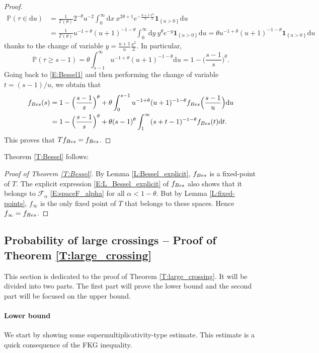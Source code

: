 \documentclass[11pt]{article}
\theoremstyle{remark}
\newcommand{\Fc}{\mathcal{F}}
\newcommand{\Prob}[1]{\mathbb{P} \left( #1 \right) }
\newcommand{\indic}[1]{ \mathbf{1}_{ \left\{ #1 \right\} } }
\renewcommand{\d}{\mathrm{d}}
\numberwithin{equation}{section}
\begin{document}
\begin{proof}
\begin{align*}
\Prob{ \tau \in \d u }
& = \frac{1}{\Gamma(\theta)} 2^{-\theta} u^{-2} \int_0^\infty \d x ~x^{2\theta + 1} e^{- \frac{u+1}{u}\frac{x^2}{2}} \indic{u >0} \d u \\
& = \frac{1}{\Gamma(\theta)} u^{-1+\theta} (u+1)^{-1-\theta} \int_0^\infty \d y ~ y^\theta e^{-y} \indic{u >0} \d u
= \theta u^{-1+\theta} (u+1)^{-1-\theta} \indic{u >0} \d u
\end{align*}
thanks to the change of variable $y = \frac{u+1}{u}\frac{x^2}{2}$.
In particular,
\[
\Prob{ \tau \geq s-1} = \theta \int_{s-1}^\infty u^{-1+\theta} (u+1)^{-1-\theta} \d u = 1 - \Big( \frac{s-1}{s} \Big)^\theta.
\]
Going back to \eqref{E:Bessel1} and then performing the change of variable $t = (s-1)/u$, we obtain that
\begin{align*}
f_{\rm Bes}(s) & = 1 - \Big( \frac{s-1}{s} \Big)^\theta
+ \theta \int_0^{s-1} u^{-1+\theta} (u+1)^{-1-\theta} f_{\rm Bes} \Big( \frac{s-1}{u} \Big) \d u \\
& = 1 - \Big( \frac{s-1}{s} \Big)^\theta + \theta (s-1)^\theta \int_1^\infty (s+t-1)^{-1-\theta} f_{\rm Bes}(t) \d t.
\end{align*}
This proves that $Tf_{\rm Bes} = f_{\rm Bes}$.
\end{proof}

Theorem \ref{T:Bessel} follows:


\begin{proof}[Proof of Theorem \ref{T:Bessel}]
By Lemma \ref{L:Bessel_explicit}, $f_{\rm Bes}$ is a fixed-point of $T$. The explicit expression \eqref{E:L_Bessel_explicit} of $f_{\rm Bes}$ also shows that it belongs to $\Fc_\alpha$ \eqref{E:spaceF_alpha} for all $\alpha < 1-\theta$. But by Lemma \ref{L:fixed-points}, $f_\infty$ is the only fixed point of $T$ that belongs to these spaces. Hence $f_\infty = f_{\rm Bes}$.
\end{proof}





\subsection{Probability of large crossings -- Proof of Theorem \ref{T:large_crossing}}\label{S:large_crossing}


This section is dedicated to the proof of Theorem \ref{T:large_crossing}. It will be divided into two parts. The first part will prove the lower bound and the second part will be focused on the upper bound. 

\paragraph{Lower bound} We start by showing some supermultiplicativity-type estimate. This estimate is a quick consequence of the FKG inequality.
\end{document}
